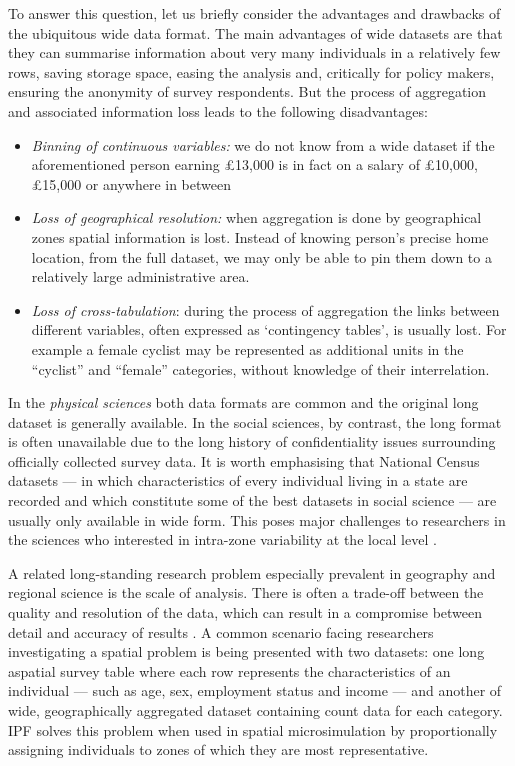 \documentclass[a4paper,10pt]{article}
\begin{document}
To answer this question, let us briefly consider the advantages and drawbacks of the ubiquitous wide
data format. The main advantages of wide datasets are that they can summarise information about very many individuals
in a relatively few rows, saving storage space, easing the analysis and, critically for policy makers,
ensuring the anonymity of
survey respondents. But the process of aggregation
and associated information loss
leads to the following disadvantages:
\begin{itemize}
 \item \emph{Binning of continuous variables:} we do
not know from a wide dataset if the aforementioned person earning \pounds13,000 is in fact on a salary of
\pounds10,000, \pounds15,000 or 
anywhere in between
 \item \emph{Loss of geographical resolution:} when aggregation is done by geographical zones
 spatial information is lost. Instead of knowing person's precise home location, from the full dataset, we
may only be able to pin them down to a relatively large administrative area.
 \item \emph{Loss of cross-tabulation}: during the process of
aggregation the links between different variables, often expressed as `contingency tables',
is usually lost. For example a female cyclist may be represented as additional units in the
``cyclist'' and ``female'' categories, without knowledge of their interrelation.
\end{itemize}

In the \emph{physical sciences} both data formats are common and the
original long dataset is generally available. In the social sciences, by contrast, the long format is often unavailable
due to the long history of confidentiality
issues surrounding officially collected survey data.
It is worth emphasising that National Census datasets --- in which characteristics of 
every individual living in a state are recorded and which constitute some of the best datasets in social science ---
are usually only available
in wide form. This poses major challenges to researchers in the sciences who
interested in intra-zone variability at the local level \citep{Whitworth2012,Lee2009}.

A related long-standing research problem especially prevalent in geography and regional science
is the scale of analysis. There is often a trade-off between the quality and resolution 
of the data, which can result in a compromise between detail and accuracy of results 
\citep{ballas2003microsimulation-30-years}. A common scenario facing researchers investigating 
a spatial problem is being presented with two datasets: one long aspatial 
survey table where each row represents the characteristics of an individual --- such as
age, sex, employment status and income --- and another of wide, geographically aggregated 
dataset containing count data for each category. IPF solves this problem when used in
spatial microsimulation by proportionally assigning individuals to zones of which they
are most representative.
\end{document}
